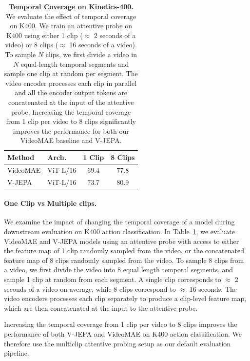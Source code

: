 \documentclass[twocolumn]{fairmeta}
\newcommand{\putalg}{{\small V-JEPA}\xspace}
\newcommand{\cc}{\cellcolor{metabg}}
\theoremstyle{plain}
\theoremstyle{definition}
\theoremstyle{remark}
\begin{document}
\begin{table}[h]
    \centering
    \caption{\small{\bf Temporal Coverage on Kinetics-400.} We evaluate the effect of temporal coverage on K400. We train an attentive probe on K400 using either 1 clip ($\approx$ 2 seconds of a video) or 8 clips ($\approx$ 16 seconds of a video). To sample $N$ clips, we first divide a video in $N$ equal-length temporal segments and sample one clip at random per segment. The video encoder processes each clip in parallel and all the encoder output tokens are concatenated at the input of the attentive probe. Increasing the temporal coverage from 1 clip per video to 8 clips significantly improves the performance for both our VideoMAE baseline and \putalg.}
    \label{tb:lin_nbclips}
    {\fontsize{8.5pt}{8.5pt}\selectfont
    \begin{tabular}{l l c c}
        \bf\small Method & \bf\small Arch. & 1 Clip & 8 Clips\\
        \toprule
        VideoMAE & ViT-L/16 &  69.4 & 77.8\\[1ex]
        \multirow{1}{*}{V-JEPA} & ViT-L/16 & \cc 73.7 & \cc 80.9\\
    \end{tabular}}
\end{table}

\paragraph{One Clip vs Multiple clips.}
We examine the impact of changing the temporal coverage of a model during downstream evaluation on K400 action classification.
In Table~\ref{tb:lin_nbclips}, we evaluate VideoMAE and \putalg models using an attentive probe with access to either the feature map of 1 clip randomly sampled from the video, or the concatenated feature map of 8 clips randomly sampled from the video.
To sample 8 clips from a video, we first divide the video into 8 equal length temporal segments, and sample 1 clip at random from each segment.
A single clip corresponds to $\approx$ 2 seconds of a video on average, while 8 clips correspond to $\approx$ 16 seconds.
The video encoders processes each clip separately to produce a clip-level feature map, which are then concatenated at the input to the attentive probe.

Increasing the temporal coverage from 1 clip per video to 8 clips improves the performance of both \putalg and VideoMAE on K400 action classification.
We therefore use the multiclip attentive probing setup as our default evaluation pipeline.
\end{document}
